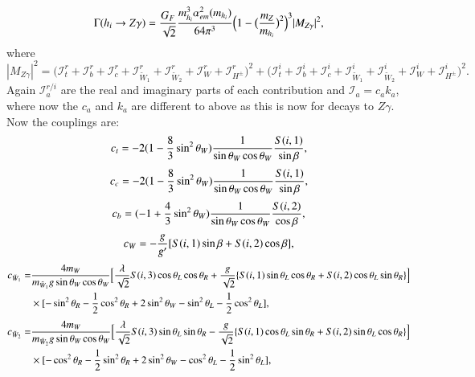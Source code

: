\documentclass[final,3p,times]{elsarticle}
\begin{document}
\begin{equation} \label{hZgamNMSSM}
\Gamma (h_{i} \rightarrow Z \gamma) = {G_{F} \over \sqrt{2}} {m_{h_i}^3 \alpha_{em}^2 (m_{h_i}) \over 64 \pi^3} \Big(1 - \big({m_{Z} \over m_{h_i}}\big)^2\Big)^3 |M_{Z \gamma}|^2,
\end{equation}
where
\begin{equation}
|M_{Z \gamma}|^2 = \Big(\mathcal{I}_{t}^{r} + \mathcal{I}_{b}^{r} + \mathcal{I}_{c}^{r} + \mathcal{I}_{\tilde{W}_1}^{r} + \mathcal{I}_{\tilde{W}_2}^{r} + \mathcal{I}_{W}^{r} + \mathcal{I}_{H^{\pm}}^{r}\Big)^2 + \Big(\mathcal{I}_{t}^{i} + \mathcal{I}_{b}^{i} + \mathcal{I}_{c}^{i} + \mathcal{I}_{\tilde{W}_1}^{i} + \mathcal{I}_{\tilde{W}_2}^{i} + \mathcal{I}_{W}^{i} + \mathcal{I}_{H^{\pm}}^{i}\Big)^2.
\end{equation}
Again $\mathcal{I}_{a}^{r/i}$ are the real and imaginary parts of each contribution and $\mathcal{I}_{a} = c_{a} k_{a}$, where now the $c_{a}$ and $k_{a}$ are different to above as this is now for decays to $Z \gamma$.
Now the couplings are:
\begin{equation}
c_{t} = -2(1-{8 \over 3}\sin^2 \theta_W){1 \over \sin\theta_W \cos\theta_W}{S(i,1) \over \sin\beta},
\end{equation}
\begin{equation}
c_{c} = -2(1-{8 \over 3}\sin^2 \theta_W){1 \over \sin\theta_W \cos\theta_W}{S(i,1) \over \sin\beta},
\end{equation}
\begin{equation}
c_{b} = (-1+{4 \over 3}\sin^2 \theta_W){1 \over \sin\theta_W \cos\theta_W}{S(i,2) \over \cos\beta},
\end{equation}
\begin{equation}
c_{W} = -{g \over g'} [S(i,1)\sin\beta + S(i,2)\cos\beta],
\end{equation}
\begin{equation}
\begin{aligned}
c_{\tilde{W}_1} = & {4 m_{W} \over m_{\tilde{W}_1} g \sin\theta_W \cos\theta_W}\Big[ {\lambda \over \sqrt{2}} S(i,3) \cos\theta_L \cos\theta_R + {g \over \sqrt{2}}\{S(i,1)\sin\theta_L \cos\theta_R + S(i,2)\cos\theta_L \sin\theta_R\}\Big] \\ & \times [-\sin^2 \theta_R - {1 \over 2} \cos^2 \theta_R + 2 \sin^2 \theta_W - \sin^2 \theta_L - {1 \over 2}\cos^2 \theta_L],
\end{aligned}
\end{equation}
\begin{equation}
\begin{aligned}
c_{\tilde{W}_2} = & {4 m_{W} \over m_{\tilde{W}_2} g \sin\theta_W \cos\theta_W}\Big[ {\lambda \over \sqrt{2}} S(i,3) \sin\theta_L \sin\theta_R - {g \over \sqrt{2}}\{S(i,1)\cos\theta_L \sin\theta_R + S(i,2)\sin\theta_L \cos\theta_R\}\Big]\\ & \times [-\cos^2 \theta_R - {1 \over 2} \sin^2 \theta_R + 2 \sin^2 \theta_W - \cos^2 \theta_L - {1 \over 2}\sin^2 \theta_L],
\end{aligned}
\end{equation}
\end{document}
